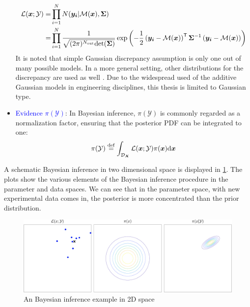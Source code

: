\begin{itemize}[left=0pt]
\begin{equation}
\begin{aligned}
         \mathcal{L}(\boldsymbol{x};\mathcal{Y}) =& \prod_{i=1}^{N} N(\boldsymbol{y_{i}}|\mathcal{M}(\boldsymbol{x}),\boldsymbol{\Sigma}) \\
         =& \prod_{i=1}^{N}\frac{1}{\sqrt{(2 \pi)^{N_{\rm{out}}}{\rm{det}} 
         (\boldsymbol{\Sigma})}}\exp\left(-\frac{1}{2}\left(\boldsymbol{y_i} - \mathcal{M}(\boldsymbol{x})\right)^{\mathsf{T}} \boldsymbol{\Sigma}^{-1}\left(\boldsymbol{y_i} - \mathcal{M}(\boldsymbol{x})\right)\right) 
        \end{aligned}
        \end{equation} 
It is noted that simple Gaussian discrepancy assumption is only one out of many possible models. In a more general setting, other distributions for the discrepancy are used as well \citep{UQdoc}. Due to the widespread used of the additive Gaussian models in engineering disciplines, this thesis is limited to Gaussian type. 
    \item \textcolor{blue}{Evidence $\pi(\mathcal{Y})$}: In Bayesian inference, $\pi(\mathcal{Y})$ is commonly regarded as a normalization factor, ensuring that the posterior \acrshort{PDF} can be integrated to one:
\begin{equation}
        \label{eq: evidence}
        \pi(\mathcal{Y}) \stackrel{\rm{def}}{=} \int_{\mathcal{D}_{\boldsymbol{X}}} 
        {\mathcal{L}(\boldsymbol{x};\mathcal{Y}) \pi(\boldsymbol{x})}
        {\rm{d}} \boldsymbol{x}
    \end{equation}
\end{itemize}

A schematic Bayesian inference in two dimensional space is displayed in \cref{fig: BI_2D}. The plots show the various elements of the Bayesian inference procedure in the parameter and data spaces. We can see that in the parameter space, with new experimental data comes in, the posterior is more concentrated than the prior distribution. 
\begin{figure}[htbp]
    \centering
    \includegraphics[width = 140mm]{Figures/figure-BI_2D.pdf}
    \caption{An Bayesian inference example in 2D space}
    \label{fig: BI_2D}
\end{figure}
